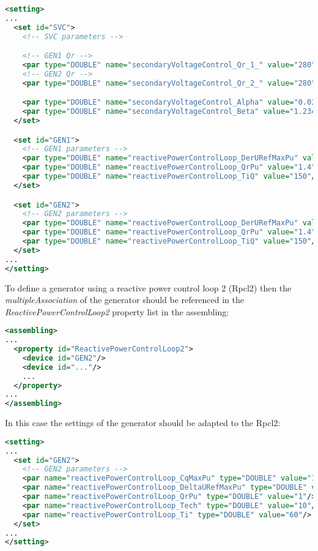 \documentclass[a4paper, 12pt]{report}
\begin{document}
\begin{lstlisting}[language=XML, breaklines=true, breakatwhitespace=false, columns=fullflexible]
<setting>
...
  <set id="SVC">
    <!-- SVC parameters -->

    <!-- GEN1 Qr -->
    <par type="DOUBLE" name="secondaryVoltageControl_Qr_1_" value="280"/>
    <!-- GEN2 Qr -->
    <par type="DOUBLE" name="secondaryVoltageControl_Qr_2_" value="280"/>

    <par type="DOUBLE" name="secondaryVoltageControl_Alpha" value="0.0308641975"/>
    <par type="DOUBLE" name="secondaryVoltageControl_Beta" value="1.2345679"/>
  </set>

  <set id="GEN1">
    <!-- GEN1 parameters -->
    <par type="DOUBLE" name="reactivePowerControlLoop_DerURefMaxPu" value="0.0002"/>
    <par type="DOUBLE" name="reactivePowerControlLoop_QrPu" value="1.4"/>
    <par type="DOUBLE" name="reactivePowerControlLoop_TiQ" value="150"/>
  </set>

  <set id="GEN2">
    <!-- GEN2 parameters -->
    <par type="DOUBLE" name="reactivePowerControlLoop_DerURefMaxPu" value="0.0002"/>
    <par type="DOUBLE" name="reactivePowerControlLoop_QrPu" value="1.4"/>
    <par type="DOUBLE" name="reactivePowerControlLoop_TiQ" value="150"/>
  </set>
...
</setting>
\end{lstlisting}


To define a generator using a reactive power control loop 2 (Rpcl2) then the \textit{multipleAssociation}
of the generator should be referenced in the \textit{ReactivePowerControlLoop2} property list in the assembling:


\begin{lstlisting}[language=XML, breaklines=true, breakatwhitespace=false, columns=fullflexible]
<assembling>
...
  <property id="ReactivePowerControlLoop2">
    <device id="GEN2"/>
    <device id="..."/>
    ...
  </property>
...
</assembling>
\end{lstlisting}

In this case the settings of the generator should be adapted to the Rpcl2:

\begin{lstlisting}[language=XML, breaklines=true, breakatwhitespace=false, columns=fullflexible]
<setting>
...
  <set id="GEN2">
    <!-- GEN2 parameters -->
    <par name="reactivePowerControlLoop_CqMaxPu" type="DOUBLE" value="15"/>
    <par name="reactivePowerControlLoop_DeltaURefMaxPu" type="DOUBLE" value="0.002"/>
    <par name="reactivePowerControlLoop_QrPu" type="DOUBLE" value="1"/>
    <par name="reactivePowerControlLoop_Tech" type="DOUBLE" value="10"/>
    <par name="reactivePowerControlLoop_Ti" type="DOUBLE" value="60"/>
  </set>
...
</setting>
\end{lstlisting}
\end{document}
